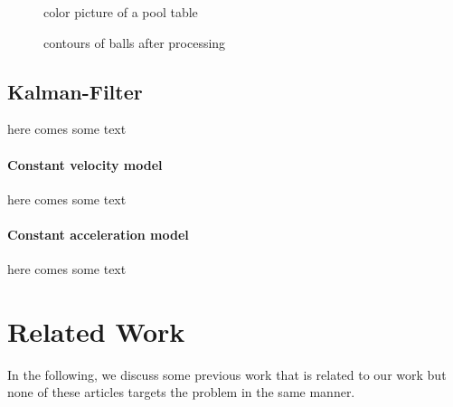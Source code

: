 \documentclass[notitlepage, a4paper, 11pt]{scrartcl}
\begin{document}
\begin{multicols}{2}
\begin{figure}[H]
    \centering
    \caption{color picture of a pool table}
    \label{pic:pool-color}
\end{figure}

\begin{figure}[H]
    \centering
    \caption{contours of balls after processing}
    \label{pic:pool-bw}
\end{figure}


\subsection{Kalman-Filter} \label{kalman-desc}

here comes some text

\paragraph{Constant velocity model} 

here comes some text

\paragraph{Constant acceleration model}

here comes some text


\section{Related Work}

In the following, we discuss some previous work that is related to our work but none of these articles targets the problem in the same manner.


\end{multicols}
\end{document}

